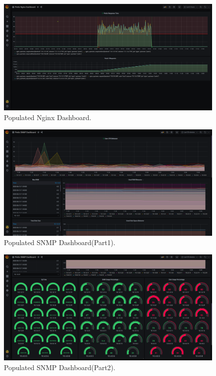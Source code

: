 \documentclass[12pt]{article}
\begin{document}
\begin{figure}[H]
  \includegraphics[width=\linewidth]{images/pretixNginxDashboard.png}
  \caption{Populated Nginx Dashboard.}
  \label{fig:nginx}
\end{figure}

\begin{figure}[H]
  \includegraphics[width=\linewidth]{images/pretixSnmpDashboard.png}
  \caption{Populated SNMP Dashboard(Part1).}
  \label{fig:snmp1}
\end{figure}

\begin{figure}[H]
  \includegraphics[width=\linewidth]{images/pretixSnmp2Dashboard.png}
  \caption{Populated SNMP Dashboard(Part2).}
  \label{fig:snmp2}
\end{figure}
\end{document}
